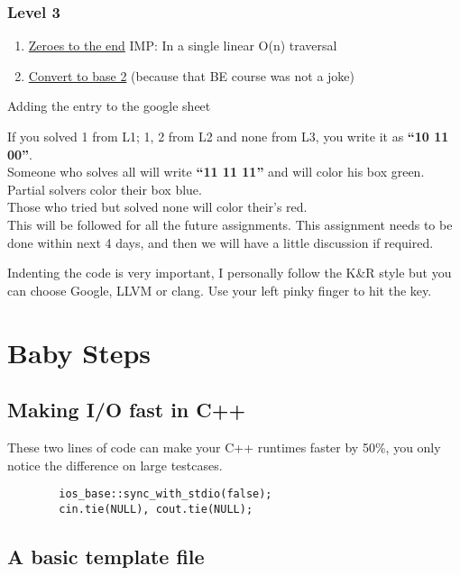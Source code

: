 \documentclass[13pt,oneside,a4paper]{book}
\begin{document}
\subsection{Level 3}
\begin{enumerate}
        \item \href{https://leetcode.com/problems/move-zeroes/}{Zeroes to the end} IMP: In a single linear O(n) traversal
        \item \href{https://leetcode.com/problems/convert-to-base-2/}{Convert to base 2} (because that BE course was not a joke)
\end{enumerate}

Adding the entry to the google sheet

If you solved 1 from L1; 1, 2 from L2 and none from L3, you write it as \textbf{``10 11 00''}.\\
Someone who solves all will write \textbf{``11 11 11''} and will color his box green.\\
Partial solvers color their box blue.\\
Those who tried but solved none will color their's red.\\

This will be followed for all the future assignments. This assignment needs to be done within next 4 days, and then we will have a little discussion if required.

Indenting the code is very important, I personally follow the K\&R style but you can choose Google, LLVM or clang. Use your left pinky finger to hit the \keys{\tab} key.

\clearpage
 
\chapter{Baby Steps}
\section{Making I/O fast in C++}
These two lines of code can make your C++ runtimes faster by 50\%, you only notice
the difference on large testcases.

\begin{verbatim}
        ios_base::sync_with_stdio(false);
        cin.tie(NULL), cout.tie(NULL);
\end{verbatim}

\section{A basic template file}
\end{document}
